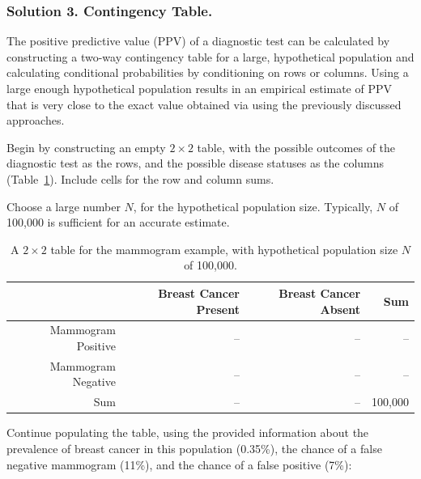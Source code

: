 \subsubsection{Solution 3. Contingency Table.}

The positive predictive value (PPV) of a diagnostic test can be calculated by constructing a two-way contingency table for a large, hypothetical population and calculating conditional probabilities by conditioning on rows or columns. Using a large enough hypothetical population results in an empirical estimate of PPV that is very close to the exact value obtained via using the previously discussed approaches.

Begin by constructing an empty $2 \times 2$ table, with the possible outcomes of the diagnostic test as the rows, and the possible disease statuses as the columns (Table~\ref{tableMammogramSetup}). Include cells for the row and column sums.

Choose a large number $N$, for the hypothetical population size. Typically, $N$ of 100,000 is sufficient for an accurate estimate. 

\begin{table}[ht]
	\centering
	\begin{tabular}{rrrr}
		\hline
		& Breast Cancer Present & Breast Cancer Absent & Sum \\ 
		\hline
		Mammogram Positive & -- & -- & -- \\ 
		Mammogram Negative & -- & -- & -- \\ 
		Sum & -- & -- & 100,000 \\ 
		\hline
	\end{tabular}
	\caption{A $2 \times 2$ table for the mammogram example, with hypothetical population size $N$ of 100,000.}
	\label{tableMammogramSetup}
\end{table}

Continue populating the table, using the provided information about the prevalence of breast cancer in this population (0.35\%), the chance of a false negative mammogram (11\%), and the chance of a false positive (7\%):

